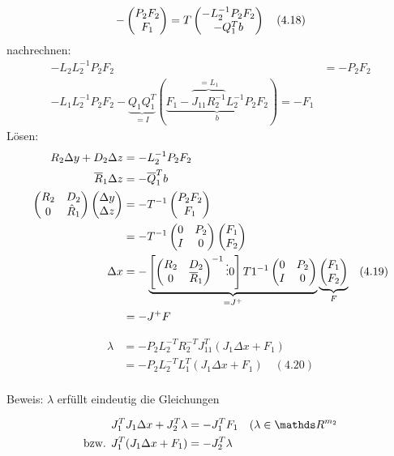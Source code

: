 \begin{itemize}
\begin{align*}
- \begin{pmatrix} P_2 F_2 \\ F_1 \end{pmatrix} &= T \begin{pmatrix} -L_2^{-1} P_2 F_2 \\ - Q_1^T b \end{pmatrix} \quad (4.18) \\
\end{align*}
nachrechnen:
\begin{align*}
-L_2 L_2^{-1} P_2 F_2 &= - P_2 F_2 \\
-L_1 L_2^{-1} P_2 F_2 - \underbrace{Q_1 Q_1^T}_{=I} (\underbrace{F_1 - \overbrace{J_{11} R_2^{-1}}^{= L_1} L_2^{-1} P_2 F_2  }_{b}) = - F_1
\end{align*}
Lösen:
\begin{align*}
R_2 \Delta y + D_2 \Delta z &= - L_2^{-1} P_2 F_2 \\
\overline R_1 \Delta z &= -\overline Q_1^T b \\
\begin{pmatrix} R_2 & D_2 \\ 0 & \hat R_1 \end{pmatrix} \begin{pmatrix} \Delta y \\ \Delta z \end{pmatrix} &= - T^{-1} \begin{pmatrix} P_2 F_2 \\ F_1 \end{pmatrix} \\
&= - T^{-1} \begin{pmatrix} 0 & P_2 \\ I & 0 \end{pmatrix} \begin{pmatrix} F_1 \\ F_2 \end{pmatrix} \\
\Delta x &= - \underbrace{ \left[ \begin{pmatrix} R_2 & D_2 \\ 0 & \overline R_1 \end{pmatrix}^{-1} \vdots 0 \right] T1^{-1} \begin{pmatrix} 0 & P_2 \\ I & 0 \end{pmatrix}}_{= J^+} \underbrace{\begin{pmatrix} F_1 \\ F_2 \end{pmatrix}}_{F} \quad (4.19) \\
&= - J^+ F
\end{align*}
\end{itemize}


\begin{align*}
\lambda &= - P_2 L_2^{-T} R_2^{-T} J_{11}^T (J_1 \Delta x + F_1) \\
&= - P_2 L_2^{-T} L_1^T (J_1 \Delta x + F_1) \quad (4.20) \\
\end{align*}

Beweis: $\lambda$ erfüllt eindeutig die Gleichungen

\begin{align*}
J_1^T J_1 \Delta x + J_2^T \lambda &= - J_1^T F_1 \quad (\lambda \in \R^{m_2} \\
\text{bzw. } J_1^T (J_1 \Delta x + F_1) &= -J_2^T \lambda \\
\end{align*}


